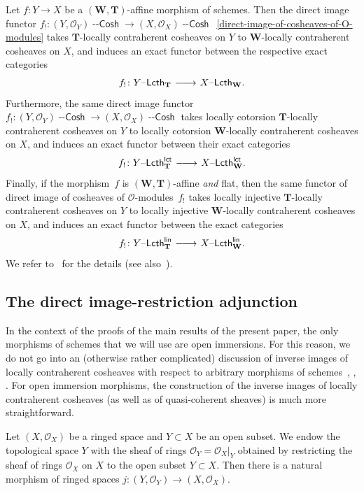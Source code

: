 \documentclass[12pt,a4paper]{amsart}
\newcommand{\+}{\nobreakdash-}
\renewcommand{\:}{\colon}
\newcommand{\rarrow}{\longrightarrow}
\newcommand{\lrarrow}{\mskip.5\thinmuskip\relbar\joinrel\relbar
   \joinrel\rightarrow\mskip.5\thinmuskip\relax}
\newcommand{\Lcth}{{\operatorname{\mathsf{--Lcth}}}}
\newcommand{\Cosh}{{\operatorname{\mathsf{--Cosh}}}}
\newcommand{\lct}{\mathsf{lct}}
\newcommand{\lin}{\mathsf{lin}}
\newcommand{\bW}{\mathbf W}
\newcommand{\bT}{\mathbf T}
\newcommand{\cO}{\mathcal O}
\theoremstyle{plain}
\theoremstyle{definition}
\begin{document}
 Let $f\:Y\rarrow X$ be a $(\bW,\bT)$\+affine morphism of schemes.
 Then the direct image functor
$f_!\:(Y,\cO_Y)\Cosh\rarrow(X,\cO_X)\Cosh$
\,\eqref{direct-image-of-cosheaves-of-O-modules}
takes $\bT$\+locally contraherent cosheaves on $Y$ to $\bW$\+locally
contraherent cosheaves on $X$, and induces an exact functor between
the respective exact categories
\begin{equation} \label{lcth-W-T-direct-image}
 f_!\:Y\Lcth_\bT\lrarrow X\Lcth_\bW.
\end{equation}
 Furthermore, the same direct image functor
$f_!\:(Y,\cO_Y)\Cosh\rarrow(X,\cO_X)\Cosh$ takes locally cotorsion
$\bT$\+locally contraherent cosheaves on $Y$ to locally cotorsion
$\bW$\+locally contraherent cosheaves on $X$, and induces an exact
functor between their exact categories
\begin{equation} \label{lcth-W-T-lct-direct-image}
 f_!\:Y\Lcth^\lct_\bT\lrarrow X\Lcth^\lct_\bW.
\end{equation}
 Finally, if the morphism~$f$ is $(\bW,\bT)$\+affine \emph{and} flat,
then the same functor of direct image of cosheaves of
$\cO$\+modules~$f_!$ takes locally injective $\bT$\+locally
contraherent cosheaves on $Y$ to locally injective $\bW$\+locally
contraherent cosheaves on $X$, and induces an exact functor
between the exact categories
\begin{equation} \label{lcth-W-T-lin-direct-image}
 f_!\:Y\Lcth^\lin_\bT\lrarrow X\Lcth^\lin_\bW.
\end{equation}
 We refer to~\cite[Section~3.3]{Pcosh} for the details
(see also~\cite[Section~2.4]{Pdomc}).

\subsection{The direct image-restriction adjunction}
 In the context of the proofs of the main results of the present
paper, the only morphisms of schemes that we will use are open
immersions.
 For this reason, we do not go into an (otherwise rather complicated)
discussion of inverse images of locally contraherent cosheaves with
respect to arbitrary morphisms of schemes~\cite[Sections~2.3
and~3.3]{Pcosh}, \cite[Section~2.5]{Pdomc}, \cite[Section~3.12]{Pform}.
 For open immersion morphisms, the construction of the inverse
images of locally contraherent cosheaves (as well as of quasi-coherent
sheaves) is much more straightforward.

 Let $(X,\cO_X)$ be a ringed space and $Y\subset X$ be an open
subset.
 We endow the topological space $Y$ with the sheaf of rings
$\cO_Y=\cO_X|_Y$ obtained by restricting the sheaf of rings $\cO_X$
on $X$ to the open subset $Y\subset X$.
 Then there is a natural morphism of ringed spaces
$j\:(Y,\cO_Y)\rarrow(X,\cO_X)$.
\end{document}
